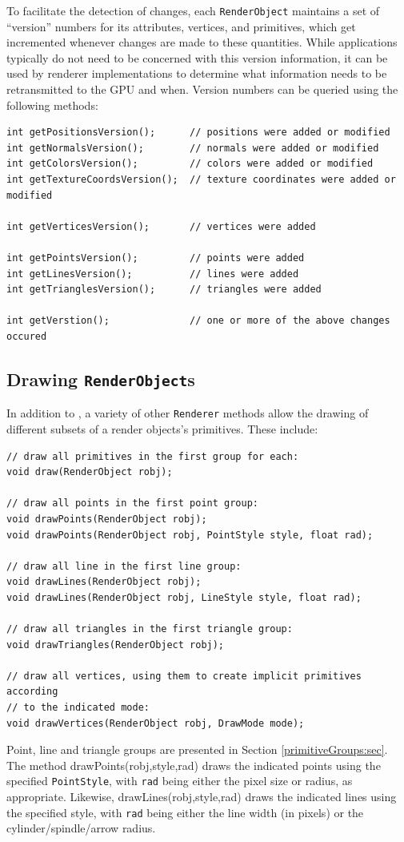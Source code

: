 To facilitate the detection of changes, each {\tt RenderObject}
maintains a set of ``version'' numbers for its attributes, vertices,
and primitives, which get incremented whenever changes are made to
these quantities. While applications typically do not need to be
concerned with this version information, it can be used by renderer
implementations to determine what information needs to be
retransmitted to the GPU and when. Version numbers can be queried
using the following methods:
%
\begin{lstlisting}[]
int getPositionsVersion();      // positions were added or modified
int getNormalsVersion();        // normals were added or modified
int getColorsVersion();         // colors were added or modified
int getTextureCoordsVersion();  // texture coordinates were added or modified

int getVerticesVersion();       // vertices were added

int getPointsVersion();         // points were added
int getLinesVersion();          // lines were added
int getTrianglesVersion();      // triangles were added

int getVerstion();              // one or more of the above changes occured
\end{lstlisting}
%

\subsection{Drawing \texttt{RenderObject}s}
\label{drawingRenderObjs:sec}

In addition to
, a variety of
other {\tt Renderer} methods allow the drawing of different subsets of
a render objects's primitives. These include:
%
\begin{lstlisting}
// draw all primitives in the first group for each:
void draw(RenderObject robj);

// draw all points in the first point group:
void drawPoints(RenderObject robj);
void drawPoints(RenderObject robj, PointStyle style, float rad);

// draw all line in the first line group:
void drawLines(RenderObject robj);
void drawLines(RenderObject robj, LineStyle style, float rad);

// draw all triangles in the first triangle group:
void drawTriangles(RenderObject robj);

// draw all vertices, using them to create implicit primitives according
// to the indicated mode:
void drawVertices(RenderObject robj, DrawMode mode);
\end{lstlisting}
%
Point, line and triangle groups are presented in Section
\ref{primitiveGroups:sec}.  The method %
{drawPoints(robj,style,rad)} draws the indicated points using the
specified {\tt PointStyle}, with {\tt rad} being either the pixel size
or radius, as appropriate.  Likewise, %
{drawLines(robj,style,rad)} draws the indicated lines using the
specified style, with {\tt rad} being either the line width (in
pixels) or the cylinder/spindle/arrow radius.

